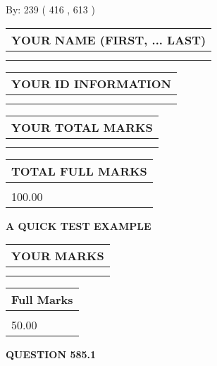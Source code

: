 \documentclass[12pt]{article}
\begin{document}
   
\hspace{1.0in} By: 
 239 ( 416 ,  613 )
   
   
   
   
\newpage 
\setcounter{page}{ 
   585001 } 
   
   
   
   
\noindent\begin{tabular}{|l|}
\hline
YOUR NAME (FIRST, ... LAST)  \\
\hline
 \\ 
 \\ 
\hline
\end{tabular}
\hspace{0.05in} \begin{tabular}{|l|}
\hline
 YOUR   ID   INFORMATION  \\
\hline
 \\ 
 \\ 
\hline
\end{tabular}
   
   
\vspace{0.2in}\noindent\begin{tabular}{|l|}
\hline
YOUR TOTAL MARKS  \\
\hline
 \\ 
 \\ 
\hline
\end{tabular}
\hspace{0.05in} \begin{tabular}{|l|}
\hline
TOTAL FULL MARKS  \\
\hline
 \\ 
100.00 \\
\hline
\end{tabular}
   
   
 \vspace{0.2in}
{\LARGE {\textbf{ A QUICK TEST EXAMPLE}}}
   
   
  
\vspace{0.2in}
  
\noindent\begin{tabular}{|l|}
\hline
 YOUR MARKS  \\
\hline
 \\ 
 \\ 
\hline
\end{tabular}
\hspace{0.05in} \begin{tabular}{|l|}
\hline
 Full Marks  \\
\hline
 \\ 
50.00 \\
\hline
\end{tabular}
{\textbf{\Large{QUESTION
585.1 
}}}
  
\end{document}
